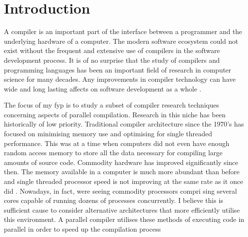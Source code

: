 \chapter{Introduction} \label{introduction}

A \gls{compiler} is an important part of the interface between a programmer
and the underlying hardware of a computer. The modern software ecosystem
could not exist without the frequent and extensive use of compilers in
the software development process. It is of no surprise that the study of
compilers and programming languages has been an important field of research
in computer science for many decades. Any improvements in compiler technology
can have wide and long lasting affects on software development as a whole
\citep{hall_compiler_2009}.

The focus of my \gls{fyp} is to study a subset of compiler research techniques
concerning aspects of parallel compilation. Research in this niche has been
historically of low priority. Traditional compiler architecture since the
1970’s has focused on minimising memory use and optimising for single threaded
performance. This was at a time when computers did not even have enough random
access memory to store all the data necessary for compiling large amounts of
source code. Commodity hardware has improved significantly since then. The
memory available in a computer is much more abundant than before and single
threaded processor speed is not improving at the same rate as it once did
\citep{shalf_future_2020, williams_whats_2017}. Nowadays, in fact, were seeing
commodity processors compri sing several cores capable of running dozens
of processes concurrently. I believe this is sufficient cause to consider
alternative architectures that more efficiently utilise this environment. A
parallel compiler utilises these methods of executing code in parallel in order
to speed up the compilation process

